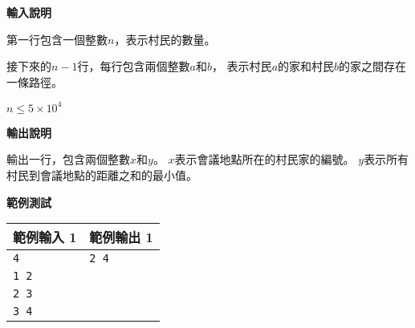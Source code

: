     \textbf{輸入說明}

    第一行包含一個整數$n$，表示村民的數量。

    接下來的$n-1$行，每行包含兩個整數$a$和$b$，
    表示村民$a$的家和村民$b$的家之間存在一條路徑。

    $n \le 5 \times 10^4$
    
    \textbf{輸出說明}

    輸出一行，包含兩個整數$x$和$y$。
    $x$表示會議地點所在的村民家的編號。
    $y$表示所有村民到會議地點的距離之和的最小值。

    \textbf{範例測試}

    \begin{tabular}{|m{7cm}|m{7cm}|}
        \hline
        範例輸入 1 & 範例輸出 1 \\
        \hline
        \verb|4|  & \verb|2 4| \\
        \verb|1 2| & \\
        \verb|2 3|  & \\
        \verb|3 4|  & \\
        \hline
    \end{tabular}

    